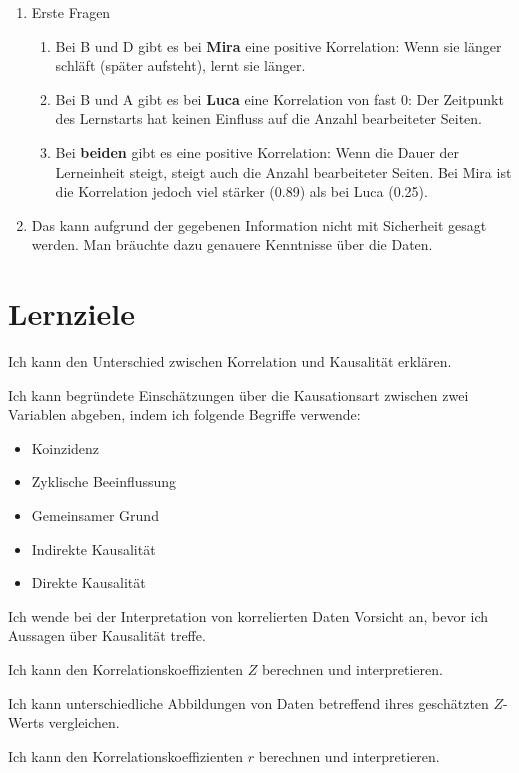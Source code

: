 \begin{myexercise}
	\begin{myanswer}
		\begin{enumerate}
			\item Erste Fragen
			      \begin{enumerate}
				      \item Bei B und D gibt es bei \textbf{Mira} eine positive Korrelation: Wenn sie länger schläft (später aufsteht), lernt sie länger.
				      \item Bei B und A gibt es bei \textbf{Luca} eine Korrelation von fast 0: Der Zeitpunkt des Lernstarts hat keinen Einfluss auf die Anzahl bearbeiteter Seiten.
				      \item Bei \textbf{beiden} gibt es eine positive Korrelation: Wenn die Dauer der Lerneinheit steigt, steigt auch die Anzahl bearbeiteter Seiten. Bei Mira ist die Korrelation jedoch viel stärker (0.89) als bei Luca (0.25).
			      \end{enumerate}
			\item Das kann aufgrund der gegebenen Information nicht mit Sicherheit gesagt werden. Man bräuchte dazu genauere Kenntnisse über die Daten.
		\end{enumerate}
	\end{myanswer}
\end{myexercise}

\clearpage
\section{Lernziele}
\begin{todolist}
	\item Ich kann den Unterschied zwischen Korrelation und Kausalität erklären.
	\item Ich kann begründete Einschätzungen über die Kausationsart zwischen zwei Variablen abgeben, indem ich folgende Begriffe verwende:
	\begin{itemize}
		\item Koinzidenz
		\item Zyklische Beeinflussung
		\item Gemeinsamer Grund
		\item Indirekte Kausalität
		\item Direkte Kausalität
	\end{itemize}
	\item Ich wende bei der Interpretation von korrelierten Daten Vorsicht an, bevor ich Aussagen über Kausalität treffe.
	\item Ich kann den Korrelationskoeffizienten \( Z \) berechnen und interpretieren.
	\item Ich kann unterschiedliche Abbildungen von Daten betreffend ihres geschätzten \(Z\)-Werts vergleichen.
	\item Ich kann den Korrelationskoeffizienten \( r \) berechnen und interpretieren.
\end{todolist}
